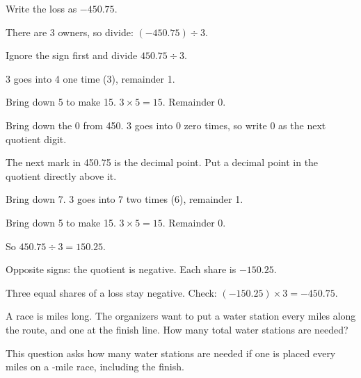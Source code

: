 \begin{steps}
  \item Write the loss as $-450.75$.
  \item There are 3 owners, so divide: $(-450.75) \div 3$.
  \item Ignore the sign first and divide $450.75 \div 3$.
  \item 3 goes into 4 one time (3), remainder 1.
  \item Bring down 5 to make 15. $3 \times 5 = 15$. Remainder 0.
  \item Bring down the 0 from 450. 3 goes into 0 zero times, so write 0 as the next quotient digit.
  \item The next mark in 450.75 is the decimal point. Put a decimal point in the quotient directly above it.
  \item Bring down 7. 3 goes into 7 two times (6), remainder 1.
  \item Bring down 5 to make 15. $3 \times 5 = 15$. Remainder 0.
  \item So $450.75 \div 3 = 150.25$.
  \item Opposite signs: the quotient is negative. Each share is $-150.25$.
\end{steps}


Three equal shares of a loss stay negative. Check: $(-150.25) \times 3 = -450.75$.


A race is  miles long. The organizers want to put a water station
every  miles along the route, and one at the finish line. How many
total water stations are needed?


This question asks how many water stations are needed if one is placed every
 miles on a -mile race, including the finish.

